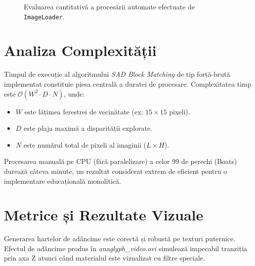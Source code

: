 \documentclass[12pt,a4paper]{report}
\begin{document}
\begin{figure}[H]
    \centering
    \caption{Evaluarea cantitativă a procesării automate efectuate de \texttt{ImageLoader}.}
    \label{fig:dataset_graph}
\end{figure}

\section{Analiza Complexității}
Timpul de execuție al algoritmului \textit{SAD Block Matching} de tip forță-brută implementat constituie piesa centrală a duratei de procesare. 
Complexitatea timp este $\mathcal{O}(W^2 \cdot D \cdot N)$, unde:
\begin{itemize}
    \item $W$ este lățimea ferestrei de vecinătate (ex: $15 \times 15$ pixeli).
    \item $D$ este plaja maximă a disparității explorate.
    \item $N$ este numărul total de pixeli al imaginii ($L \times H$).
\end{itemize}
Procesarea manuală pe CPU (fără paralelizare) a celor 99 de perechi (Boats) durează câteva minute, un rezultat considerat extrem de eficient pentru o implementare educațională monolitică.

\section{Metrice și Rezultate Vizuale}
Generarea hartelor de adâncime este corectă și robustă pe texturi puternice. Efectul de adâncime produs în \textit{anaglyph\_video.avi} simulează impecabil tranziția prin axa Z atunci când materialul este vizualizat cu filtre speciale.
\end{document}
